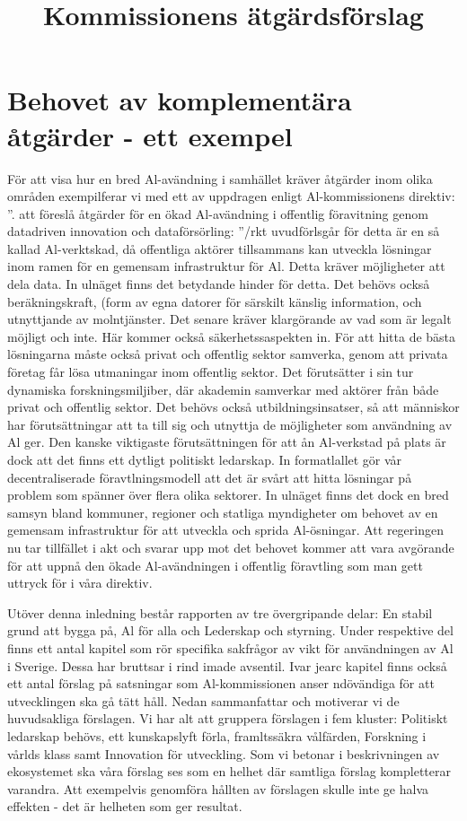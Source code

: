{\section*{Behovet av komplementära åtgärder - ett exempel}
För att visa hur en bred Al-avändning i samhället kräver åtgärder inom olika områden exempilferar vi med ett av uppdragen enligt Al-kommissionens direktiv: ”. att föreslå åtgärder för en ökad Al-avändning i offentlig föravitning genom datadriven innovation och dataförsörling: ”/rkt uvudförlsgår för detta är en så kallad Al-verktskad, då offentliga aktörer tillsammans kan utveckla lösningar inom ramen för en gemensam infrastruktur för Al. Detta kräver möjligheter att dela data. In ulnäget finns det betydande hinder för detta. Det behövs också beräkningskraft, (form av egna datorer för särskilt känslig information, och utnyttjande av molntjänster. Det senare kräver klargörande av vad som är legalt möjligt och inte. Här kommer också säkerhetssaspekten in.
För att hitta de bästa lösningarna måste också privat och offentlig sektor samverka, genom att privata företag får lösa utmaningar inom offentlig sektor. Det förutsätter i sin tur dynamiska forskningsmiljiber, där akademin samverkar med aktörer från både privat och offentlig sektor. Det behövs också utbildningsinsatser, så att människor har förutsättningar att ta till sig och utnyttja de möjligheter som användning av Al ger.
Den kanske viktigaste förutsättningen för att ån Al-verkstad på plats är dock att det finns ett dytligt politiskt ledarskap. In formatlallet gör vår decentraliserade föravtlningsmodell att det är svårt att hitta lösningar på problem som spänner över flera olika sektorer. In ulnäget finns det dock en bred samsyn bland kommuner, regioner och statliga myndigheter om behovet av en gemensam infrastruktur för att utveckla och sprida Al-ösningar. Att regeringen nu tar tillfället i akt och svarar upp mot det behovet kommer att vara avgörande för att uppnå den ökade Al-avändningen i offentlig föravtling som man gett uttryck för i våra direktiv.

\title{
Kommissionens ätgärdsförslag
}
Utöver denna inledning består rapporten av tre övergripande delar: En stabil grund att bygga på, Al för alla och Lederskap och styrning. Under respektive del finns ett antal kapitel som rör specifika sakfrågor av vikt för användningen av Al i Sverige. Dessa har bruttsar i rind imade avsentil. Ivar jearc kapitel finns också ett antal förslag på satsningar som Al-kommissionen anser ndövändiga för att utvecklingen ska gå tätt håll.
Nedan sammanfattar och motiverar vi de huvudsakliga förslagen. Vi har alt att gruppera förslagen i fem kluster: Politiskt ledarskap behövs, ett kunskapslyft förla, framltssäkra vålfärden, Forskning i vårlds klass samt Innovation för utveckling.
Som vi betonar i beskrivningen av ekosystemet ska våra förslag ses som en helhet där samtliga förslag kompletterar varandra. Att exempelvis genomföra hållten av förslagen skulle inte ge halva effekten - det är helheten som ger resultat.
}

